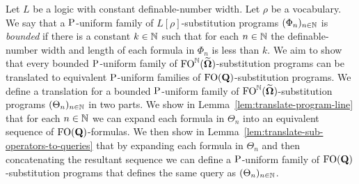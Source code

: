 \documentclass[../main/thesis.tex]{subfiles}
\begin{document}


Let $L$ be a logic with constant definable-number width. Let $\rho$ be a
vocabulary. We say that a $\mathrm{P}$-uniform family of $L[\rho]$-substitution
programs $(\Phi_n)_{n \in \mathbb{N}}$ is \emph{bounded} if there is a constant $k
\in \mathbb{N}$ such that for each $n \in \mathbb{N}$ the definable-number width and
length of each formula in $\Phi_n$ is less than $k$. We aim to show that every
bounded $\mathrm{P}$-uniform family of $\text{\upshape FO}^{\mathbb{N}} (\widetilde{\mathbf{\mathbf{\Omega}}})$-substitution
programs can be translated to equivalent $\mathrm{P}$-uniform families of
$\text{\upshape FO}(\mathbf{Q})$-substitution programs. We define a translation for a bounded
$\mathrm{P}$-uniform family of $\text{\upshape FO}^{\mathbb{N}} (\widetilde{\mathbf{\mathbf{\Omega}}})$-substitution programs
$(\Theta_n)_{n \in \mathbb{N}}$ in two parts. We show in
Lemma~\ref{lem:translate-program-line} that for each $n \in \mathbb{N}$ we can expand
each formula in $\Theta_n$ into an equivalent sequence of
$\text{\upshape FO}(\mathbf{Q})$-formulas. We then show in
Lemma~\ref{lem:translate-sub-operators-to-queries} that by expanding each
formula in $\Theta_n$ and then concatenating the resultant sequence we can
define a $\mathrm{P}$-uniform family of $\text{\upshape FO}(\mathbf{Q})$-substitution programs that
defines the same query as $(\Theta_n)_{n \in \mathbb{N}}$.
\end{document}

